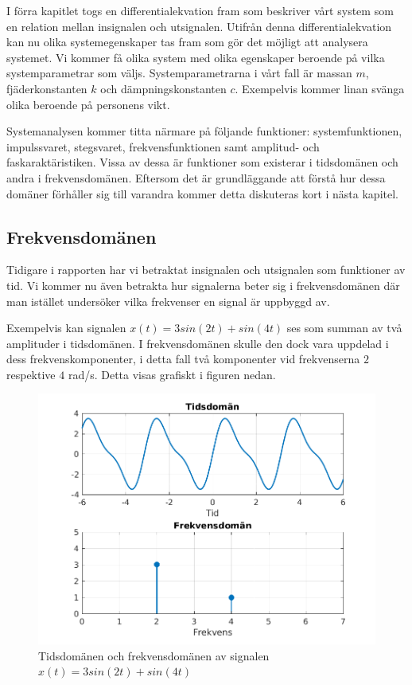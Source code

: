 I förra kapitlet togs en differentialekvation fram som beskriver vårt system som en relation mellan insignalen och utsignalen. Utifrån denna differentialekvation kan nu olika systemegenskaper tas fram som gör det möjligt att analysera systemet. Vi kommer få olika system med olika egenskaper beroende på vilka  systemparametrar som väljs. Systemparametrarna i vårt fall är massan $m$, fjäderkonstanten $k$ och dämpningskonstanten $c$. Exempelvis kommer linan svänga olika beroende på personens vikt. 

Systemanalysen kommer titta närmare på följande funktioner: systemfunktionen, impulssvaret, stegsvaret, frekvensfunktionen samt amplitud- och faskaraktäristiken. Vissa av dessa är funktioner som existerar i tidsdomänen och andra i frekvensdomänen. Eftersom det är grundläggande att förstå hur dessa domäner förhåller sig till varandra kommer detta diskuteras kort i nästa kapitel.

\newpage
\subsection{Frekvensdomänen}
Tidigare i rapporten har vi betraktat insignalen och utsignalen som funktioner av tid. Vi kommer nu även betrakta hur signalerna beter sig i frekvensdomänen där man istället undersöker vilka frekvenser en signal är uppbyggd av.

Exempelvis kan signalen $x(t)=3sin(2t) + sin(4t)$ ses som summan av två amplituder i tidsdomänen. I frekvensdomänen skulle den dock vara uppdelad i dess frekvenskomponenter, i detta fall två komponenter vid frekvenserna $2$ respektive $4$ rad/s. Detta visas grafiskt i figuren nedan.

\begin{figure}[h] 
    \centering
    \includegraphics{bilder/tid_vs_frekvens_exempel}
    \caption{Tidsdomänen och frekvensdomänen av signalen $x(t)=3sin(2t)+sin(4t)$}
    \label{fig:tid_vs_frekvens_exempel}
\end{figure}

